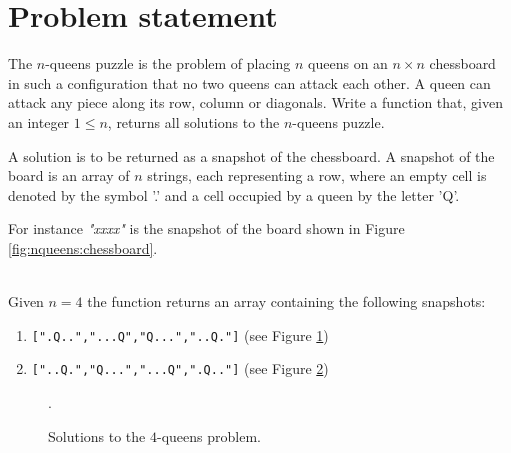 \section{Problem statement}
\begin{exercise}
\label{example:nqueens:exercice1}
The $n$-queens puzzle is the problem of placing $n$ queens on an $n \times n$ chessboard in such a
configuration that no two queens can attack each other. A queen can attack any piece along its row, column or
diagonals. Write a function that,  given an integer $1 \leq n$, returns all solutions to the
$n$-queens puzzle.

A solution is to be returned as a snapshot of the chessboard. A snapshot of the board is an array of
$n$ strings, each representing a row, where an empty cell is denoted by the symbol '.' and a cell
occupied by a queen by the letter 'Q'.

For instance \textit{"xxxx"} is the snapshot of the board shown in Figure
\ref{fig:nqueens:chessboard}. 

	\begin{example}
		\label{example:nqueens:example1}
		\hfill \\
		Given $n=4$ the function returns an array containing the following snapshots:
		\begin{enumerate}
			\item \texttt{[".Q..","...Q","Q...","..Q."]} (see Figure
			\ref{fig:nqueens:chessboard4x4_1})
			\item \texttt{["..Q.","Q...","...Q",".Q.."]} (see Figure
			\ref{fig:nqueens:chessboard4x4_2})
		\end{enumerate}
		
	\end{example}

\end{exercise}

\begin{figure}[t]
	\centering
	\begin{subfigure}[t]{0.48\textwidth}
		\centering
		\def\myfen{1q2/3q/q3/2q1 w - - 0 1} \chessboard[labelbottomformat=\arabic{filelabel},
					maxfield=d4, %
					showmover=false, %
					setfen=\myfen]
		\caption{}
		 \label{fig:nqueens:chessboard4x4_1}
	 \end{subfigure}
	\hfill
	\begin{subfigure}[t]{0.48\textwidth}
		\centering
		\def\myfen{2q1/q3/3q/1q2 w - - 0 1} \chessboard[labelbottomformat=\arabic{filelabel},
					maxfield=d4, %
					showmover=false, %
					setfen=\myfen]
		\caption{}
		 \label{fig:nqueens:chessboard4x4_2}
	 \end{subfigure}

	\caption{Solutions to the $4$-queens problem.}.
	 \label{fig:nqueens:chessboard4x4}
\end{figure}

